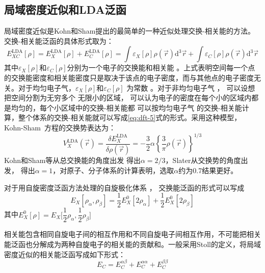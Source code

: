 \subsection{局域密度近似和LDA泛函}
局域密度近似是Kohn和Sham提出的最简单的一种近似处理交换-相关能的方法。交换-相关能{泛函}的具体形式取为：
\begin{equation}
  \label{eq:dft-5}
  E_{XC}^{\mathrm{LDA}}[\rho]=E_X^{\mathrm{LDA}}[\rho]+E_C^{\mathrm{LDA}}[\rho]=\int\varepsilon_X[\rho]\rho(\vec{r}) \textrm{d}^3\vec{r}+\int\varepsilon_C[\rho]\rho(\vec{r}) \textrm{d}^3\vec{r}
\end{equation}
其中$\varepsilon_X[\rho]$和$\varepsilon_C[\rho]$分别为{一个电子的}交换能和相关能%
。上式表明空间每一个点的交换能密度和相关能密度只是取决于该点的电子密度，而与其他点的电子密度无关。对{于均匀电子气，}$\varepsilon_X[\rho]$和$\varepsilon_C[\rho]$%
{为常数%
。}对于非均匀电子气%
，%
{可以设想}把空间分割为无穷多个%
{无限}小的区域，%
{可以认为}电子的密度在每个小的区域内都是均匀的，每个小区域中的交换-相关能都%
{可以按}均匀电子气%
的交换-相关能{计算}，整个体系的交换-相关能就可以写成\eqref{eq:dft-5}式的形式。{采用}这种模型{，}%
\textrm{Kohn-Sham~}方程的交换势表达为：
\begin{equation} \label{eq:dft-6}
	V_X^{\mathrm{LDA}}(\vec{r}) =\dfrac {\delta E_X^{\mathrm{LDA}}}{\delta\rho(\vec{r}) }=-\dfrac 32\alpha\left\{\dfrac3\pi\rho(\vec{r}) \right\}^{1/3}
\end{equation}
Kohn和Sham等从总交换能的角度出发%
{得}出$\alpha=2/3$\cite{PR140-A1133_1965}，Slater从交换势的角度出发，%
{得}出$\alpha=1$\cite{PR81-385_1951}，对原子、分子体系的计算表明，选取$\alpha$约为0.7\cite{AQC6-1_1972,Slater-4_1974}结果更好。

对于用自旋密度泛函方法处理的自旋极化体系%
，%
交换能{泛函的}形式可以写成\cite{PRA20-397_1979}
\begin{equation} \label{eq:dft-7}
E_X[\rho_{\alpha},\rho_{\beta}]=\frac12E_X^{0}[2\rho_{\alpha}]+\frac12E_X^{0}[2\rho_{\beta}]
\end{equation}
其中$E_X^{0}[\rho]=E_X\bigl[\dfrac 12\rho_{\alpha},\dfrac 12\rho_{\beta}\bigr]$

相关能包含相同自旋电子间的相互作用和不同自旋电子间相互作用，不可能把相关能泛函也分解成为两种自旋电子的相关能的贡献和。一般采用Stoll\cite{TCA49-143_1978}的定义，将局域密度近似的相关能泛函写成如下形式：
\begin{equation}
  E_C=E_C^{\alpha\beta}+E_C^{\alpha\alpha}+E_C^{\beta\beta}
  \label{eq:dft-17}
\end{equation}

